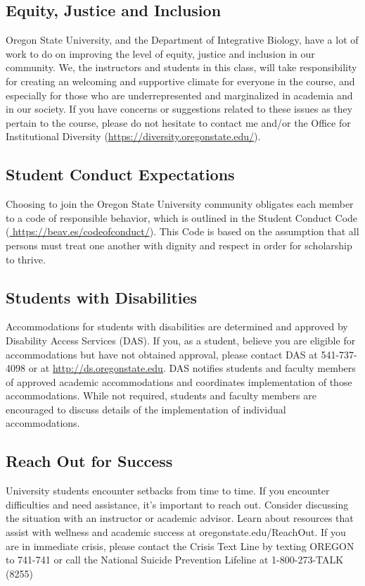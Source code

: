 \documentclass[10pt]{article}
\begin{document}
\subsection*{Equity, Justice and Inclusion}
Oregon State University, and the Department of Integrative Biology, have a lot of work to do on
improving the level of equity, justice and inclusion in our community.
We, the instructors and students in this class, will take responsibility for creating an welcoming and supportive climate for everyone in the course, and especially for those who are underrepresented and marginalized in academia and in our society. If you have concerns or suggestions related to these issues as they pertain to the course, please do not
hesitate to contact me and/or the Office for Institutional Diversity
(\href{https://diversity.oregonstate.edu/}{https://diversity.oregonstate.edu/}).

\subsection*{Student Conduct Expectations}
Choosing to join the Oregon State University community obligates each member to a code of responsible
behavior, which is outlined in the Student Conduct Code
(\href{https://beav.es/codeofconduct/}{ https://beav.es/codeofconduct/}).
This Code is based on the assumption that all persons must treat one another with dignity and respect
in order for scholarship to thrive.

\subsection*{Students with Disabilities}
Accommodations for students with disabilities are determined and approved by Disability Access
Services (DAS).
If you, as a student, believe you are eligible for accommodations but have not obtained approval, please
contact DAS at 541-737-4098 or at
\href{http://ds.oregonstate.edu}{http://ds.oregonstate.edu}.
DAS notifies students and faculty members of approved academic accommodations and coordinates
implementation of those accommodations.
While not required, students and faculty members are encouraged to discuss details of the
implementation of individual accommodations.

\subsection*{Reach Out for Success}
University students encounter setbacks from time to time. If you encounter difficulties and need assistance, it’s important to reach out. Consider discussing the situation with an instructor or academic advisor. Learn about resources that assist with wellness and academic success at oregonstate.edu/ReachOut. If you are in immediate crisis, please contact the Crisis Text Line by texting OREGON to 741-741 or call the National Suicide Prevention Lifeline at 1-800-273-TALK (8255)
\end{document}
